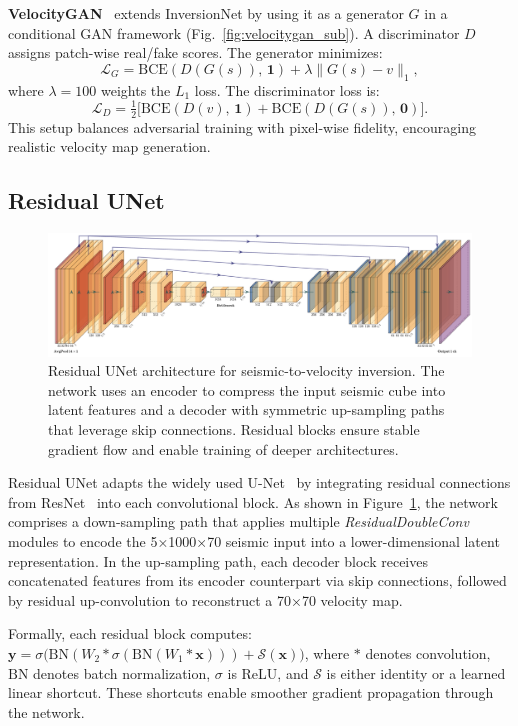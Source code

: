 \documentclass{article}
\begin{document}
\textbf{VelocityGAN}~\cite{velocitygan} extends InversionNet by using it as a generator \(G\) in a conditional GAN framework (Fig.~\ref{fig:velocitygan_sub}). A discriminator \(D\) assigns patch-wise real/fake scores. The generator minimizes:
\[
\mathcal{L}_G = \mathrm{BCE}(D(G(s)),\,\mathbf{1}) + \lambda \lVert G(s) - v \rVert_1,
\]
where \(\lambda=100\) weights the \(L_1\) loss. The discriminator loss is:
\[
\mathcal{L}_D = \tfrac{1}{2}\bigl[\mathrm{BCE}(D(v),\,\mathbf{1}) + \mathrm{BCE}(D(G(s)),\,\mathbf{0})\bigr].
\]
This setup balances adversarial training with pixel-wise fidelity, encouraging realistic velocity map generation.

\subsection{Residual UNet}

\begin{figure}
    \centering
    \includegraphics[width=0.8\linewidth]{figures/ResidualUNet.png}
    \caption{Residual UNet architecture for seismic-to-velocity inversion. The network uses an encoder to compress the input seismic cube into latent features and a decoder with symmetric up-sampling paths that leverage skip connections. Residual blocks ensure stable gradient flow and enable training of deeper architectures.}
    \label{fig:residual_unet}
\end{figure}

Residual UNet adapts the widely used U-Net~\cite{ronneberger2015u} by integrating residual connections from ResNet~\cite{he2016deep} into each convolutional block. As shown in Figure~\ref{fig:residual_unet}, the network comprises a down-sampling path that applies multiple \emph{ResidualDoubleConv} modules to encode the 5×1000×70 seismic input into a lower-dimensional latent representation. In the up-sampling path, each decoder block receives concatenated features from its encoder counterpart via skip connections, followed by residual up-convolution to reconstruct a 70×70 velocity map.

Formally, each residual block computes: $\mathbf{y} = \sigma\bigl(\mathrm{BN}(W_2 * \sigma(\mathrm{BN}(W_1 * \mathbf{x}))) + \mathcal{S}(\mathbf{x})\bigr)$, where \( * \) denotes convolution, \(\mathrm{BN}\) denotes batch normalization, \(\sigma\) is ReLU, and \(\mathcal{S}\) is either identity or a learned linear shortcut. These shortcuts enable smoother gradient propagation through the network.
\end{document}
